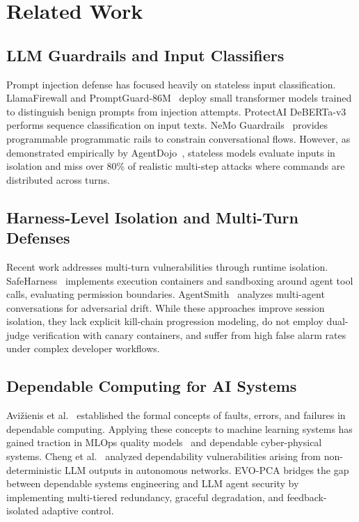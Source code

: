\documentclass[conference]{IEEEtran}
\begin{document}
\section{Related Work}

\subsection{LLM Guardrails and Input Classifiers}
Prompt injection defense has focused heavily on stateless input classification. LlamaFirewall and PromptGuard-86M~\cite{llamafirewall2024} deploy small transformer models trained to distinguish benign prompts from injection attempts. ProtectAI DeBERTa-v3~\cite{protectai2024} performs sequence classification on input texts. NeMo Guardrails~\cite{nemoguardrails2023} provides programmable programmatic rails to constrain conversational flows. However, as demonstrated empirically by AgentDojo~\cite{agentdojo2024}, stateless models evaluate inputs in isolation and miss over 80\% of realistic multi-step attacks where commands are distributed across turns.

\subsection{Harness-Level Isolation and Multi-Turn Defenses}
Recent work addresses multi-turn vulnerabilities through runtime isolation. SafeHarness~\cite{liu2024safeharness} implements execution containers and sandboxing around agent tool calls, evaluating permission boundaries. AgentSmith~\cite{sharma2024agentsmith} analyzes multi-agent conversations for adversarial drift. While these approaches improve session isolation, they lack explicit kill-chain progression modeling, do not employ dual-judge verification with canary containers, and suffer from high false alarm rates under complex developer workflows.

\subsection{Dependable Computing for AI Systems}
Avi\v{z}ienis et al.~\cite{avizienis2004basic} established the formal concepts of faults, errors, and failures in dependable computing. Applying these concepts to machine learning systems has gained traction in MLOps quality models~\cite{siebert2022mlops} and dependable cyber-physical systems. Cheng et al.~\cite{dsn2024llm} analyzed dependability vulnerabilities arising from non-deterministic LLM outputs in autonomous networks. EVO-PCA bridges the gap between dependable systems engineering and LLM agent security by implementing multi-tiered redundancy, graceful degradation, and feedback-isolated adaptive control.
\end{document}

